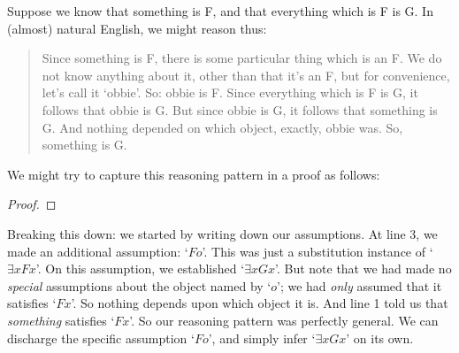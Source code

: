 Suppose we know that something is F, and that everything which is F is G. In (almost) natural English, we might reason thus:
	\begin{quote}
		Since something is F, there is some particular thing which is an F. We do not know anything about it, other than that it's an F, but for convenience, let's call it `obbie'. So: obbie is F. Since everything which is F is G, it follows that obbie is G. But since obbie is G, it follows that something is G. And nothing depended on which object, exactly, obbie was. So, something is G.
	\end{quote}
We might try to capture this reasoning pattern in a proof as follows:
\begin{proof}
	\open{}
	\open
		 
	\close
\end{proof}\noindent
Breaking this down: we started by writing down our assumptions. At line 3, we made an additional assumption: `$Fo$'. This was just a substitution instance of `$\exists x Fx$'. On this assumption, we established `$\exists x Gx$'. But note that we had made no \emph{special} assumptions about the object named by `$o$'; we had \emph{only} assumed that it satisfies `$Fx$'. So nothing depends upon which object it is. And line 1 told us that \emph{something} satisfies `$Fx$'. So our reasoning pattern was perfectly general. We can discharge the specific assumption `$Fo$', and simply infer `$\exists x Gx$' on its own.

